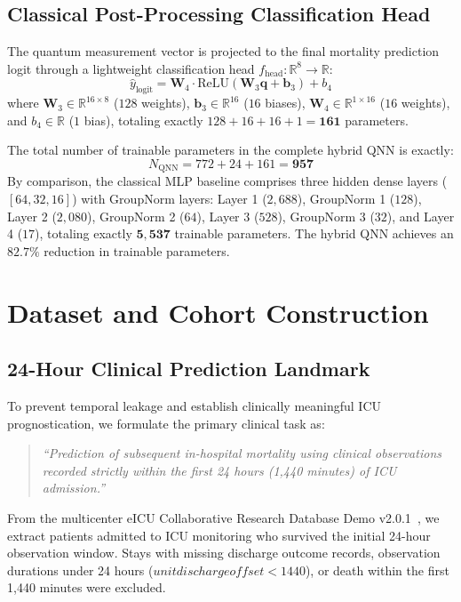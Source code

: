 \documentclass[conference]{IEEEtran}
\begin{document}
\subsection{Classical Post-Processing Classification Head}
The quantum measurement vector is projected to the final mortality prediction logit through a lightweight classification head $f_{\text{head}}: \mathbb{R}^8 \to \mathbb{R}$:
\begin{equation}
    \hat{y}_{\text{logit}} = \mathbf{W}_4 \cdot \text{ReLU}(\mathbf{W}_3 \mathbf{q} + \mathbf{b}_3) + b_4
\end{equation}
where $\mathbf{W}_3 \in \mathbb{R}^{16 \times 8}$ ($128$ weights), $\mathbf{b}_3 \in \mathbb{R}^{16}$ ($16$ biases), $\mathbf{W}_4 \in \mathbb{R}^{1 \times 16}$ ($16$ weights), and $b_4 \in \mathbb{R}$ ($1$ bias), totaling exactly $128 + 16 + 16 + 1 = \mathbf{161}$ parameters. 

The total number of trainable parameters in the complete hybrid QNN is exactly:
\begin{equation}
    N_{\text{QNN}} = 772 + 24 + 161 = \mathbf{957}
\end{equation}
By comparison, the classical MLP baseline comprises three hidden dense layers ($[64, 32, 16]$) with GroupNorm layers: Layer 1 ($2,688$), GroupNorm 1 ($128$), Layer 2 ($2,080$), GroupNorm 2 ($64$), Layer 3 ($528$), GroupNorm 3 ($32$), and Layer 4 ($17$), totaling exactly $\mathbf{5,537}$ trainable parameters. The hybrid QNN achieves an $\mathbf{82.7\%}$ reduction in trainable parameters.

\section{Dataset and Cohort Construction}
\subsection{24-Hour Clinical Prediction Landmark}
To prevent temporal leakage and establish clinically meaningful ICU prognostication, we formulate the primary clinical task as:
\begin{quote}
\textit{``Prediction of subsequent in-hospital mortality using clinical observations recorded strictly within the first 24 hours (1,440 minutes) of ICU admission.''}
\end{quote}
From the multicenter eICU Collaborative Research Database Demo v2.0.1~\cite{pollard2018eicu}, we extract patients admitted to ICU monitoring who survived the initial 24-hour observation window. Stays with missing discharge outcome records, observation durations under 24 hours ($unitdischargeoffset < 1440$), or death within the first 1,440 minutes were excluded.
\end{document}
